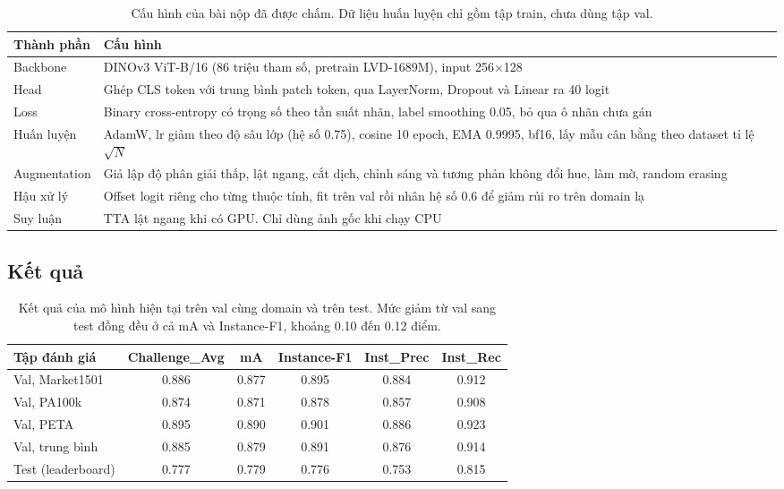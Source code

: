 \documentclass[11pt,a4paper]{article}
\begin{document}
\begin{table}[H]
\centering\small
\begin{tabularx}{\linewidth}{@{}lX@{}}
\toprule
Thành phần & Cấu hình \\
\midrule
Backbone & DINOv3 ViT-B/16 (86 triệu tham số, pretrain LVD-1689M), input 256×128 \\
Head & Ghép CLS token với trung bình patch token, qua LayerNorm, Dropout và Linear ra 40 logit \\
Loss & Binary cross-entropy có trọng số theo tần suất nhãn, label smoothing 0.05, bỏ qua ô nhãn chưa gán \\
Huấn luyện & AdamW, lr giảm theo độ sâu lớp (hệ số 0.75), cosine 10 epoch, EMA 0.9995, bf16, lấy mẫu cân bằng theo dataset tỉ lệ $\sqrt{N}$ \\
Augmentation & Giả lập độ phân giải thấp, lật ngang, cắt dịch, chỉnh sáng và tương phản không đổi hue, làm mờ, random erasing \\
Hậu xử lý & Offset logit riêng cho từng thuộc tính, fit trên val rồi nhân hệ số 0.6 để giảm rủi ro trên domain lạ \\
Suy luận & TTA lật ngang khi có GPU. Chỉ dùng ảnh gốc khi chạy CPU \\
\bottomrule
\end{tabularx}
\caption{Cấu hình của bài nộp đã được chấm. Dữ liệu huấn luyện chỉ gồm tập train, chưa dùng tập val.}
\end{table}

\subsection{Kết quả}

\begin{table}[H]
\centering\small
\begin{tabular}{@{}lccccc@{}}
\toprule
Tập đánh giá & Challenge\_Avg & mA & Instance-F1 & Inst\_Prec & Inst\_Rec \\
\midrule
Val, Market1501 & 0.886 & 0.877 & 0.895 & 0.884 & 0.912 \\
Val, PA100k & 0.874 & 0.871 & 0.878 & 0.857 & 0.908 \\
Val, PETA & 0.895 & 0.890 & 0.901 & 0.886 & 0.923 \\
Val, trung bình & 0.885 & 0.879 & 0.891 & 0.876 & 0.914 \\
\midrule
Test (leaderboard) & 0.777 & 0.779 & 0.776 & 0.753 & 0.815 \\
\bottomrule
\end{tabular}
\caption{Kết quả của mô hình hiện tại trên val cùng domain và trên test. Mức giảm từ val sang test đồng đều ở cả mA và Instance-F1, khoảng 0.10 đến 0.12 điểm.}
\end{table}
\end{document}

